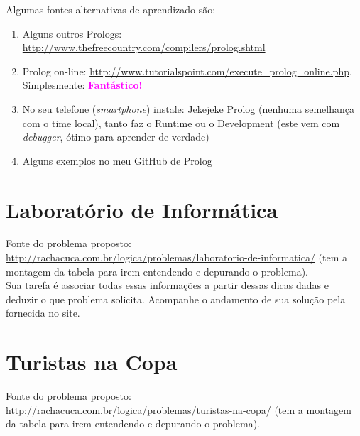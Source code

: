 \documentclass[a4paper,12pt]{article}
\begin{document}
Algumas fontes alternativas de aprendizado s\~ao:

\begin{enumerate}


\item Alguns outros Prologs:  \url{http://www.thefreecountry.com/compilers/prolog.shtml}

\item Prolog on-line: \url{http://www.tutorialspoint.com/execute_prolog_online.php}. Simplesmente: \textbf{\textcolor{magenta}{Fantástico!}}

 \item No seu telefone (\emph{smartphone}) instale: Jekejeke Prolog (nenhuma semelhança com o time local), tanto faz o Runtime ou o Development (este vem com 
 \emph{debugger}, ótimo para aprender de verdade)
 
 \item Alguns exemplos no meu GitHub de Prolog

\end{enumerate}





\newpage
\tableofcontents


\newpage
\section{Laboratório de Informática}

 Fonte do problema proposto:\\
 \url{http://rachacuca.com.br/logica/problemas/laboratorio-de-informatica/}
 (tem a montagem da tabela para irem entendendo e depurando o problema).\\


\vspace{1.5cm}
 Sua tarefa é associar todas essas informações a partir dessas dicas dadas e deduzir o que problema solicita. Acompanhe o andamento de sua solução pela fornecida no site.
\newpage
\section{Turistas na Copa}

 Fonte do problema proposto:\\
 \url{http://rachacuca.com.br/logica/problemas/turistas-na-copa/}
 (tem a montagem da tabela para irem entendendo e depurando o problema).\\
\end{document}

